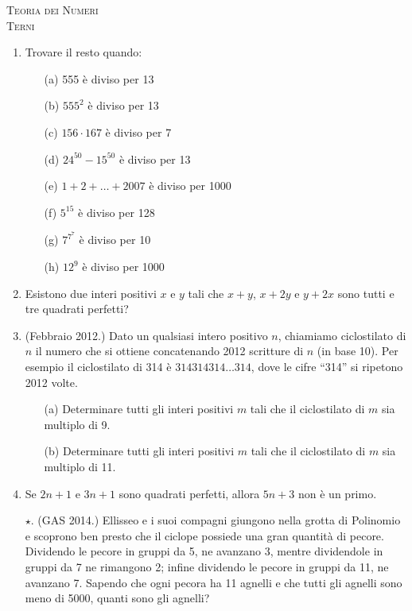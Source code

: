 \documentclass[a4paper]{article}
\theoremstyle{remark}
\theoremstyle{definition}
\begin{document}
\begin{center}
	\vspace*{0,5 cm}
	{\Huge \textsc{Teoria dei Numeri}} \\
	\vspace{0,5 cm}
	\textsc{Terni}
	\thispagestyle{empty}
	\vspace{0,7 cm}
\end{center}
\normalsize




\begin{enumerate}
	\item Trovare il resto quando:
	\begin{itemize}
		\item [(a)] 555 è diviso per 13
		\item [(b)] $ 555^2$ è diviso per 13
		\item [(c)] $ 156 \cdot 167 $ è diviso per 7
		\item [(d)] $ 24^{50} - 15^{50} $ è diviso per 13
		\item [(e)] $ 1 + 2 + \dots + 2007 $ è diviso per 1000
		\item [(f)] $ 5^{15} $ è diviso per 128
		\item [(g)]$  7^{7^7} $ è diviso per 10
		\item [(h)] $ 12^9 $ è diviso per 1000 \\
	\end{itemize}
	
	\item Esistono due interi positivi $ x $ e $ y $ tali che $ x+y $, $ x+2y $ e $ y+2x $ sono tutti e tre quadrati perfetti? \\
	
	\item (Febbraio 2012.) Dato un qualsiasi intero positivo $ n $, chiamiamo ciclostilato di $ n $ il numero che si ottiene concatenando 2012 scritture di $ n $ (in base 10). Per esempio il ciclostilato di 314 è $ 314314314\dots314 $, dove le cifre “314” si ripetono 2012 volte.
	\begin{itemize}
		\item [(a)] Determinare tutti gli interi positivi $ m $ tali che il ciclostilato di $ m $ sia multiplo di 9.
		\item [(b)] Determinare tutti gli interi positivi $ m $ tali che il ciclostilato di $ m $ sia multiplo di 11. \\
	\end{itemize}
	
	\item Se $ 2n + 1 $ e $ 3n + 1 $ sono quadrati perfetti, allora $ 5n + 3 $ non è un primo. \\
	
	\item[$ \star. $] (GAS 2014.) Ellisseo e i suoi compagni giungono nella grotta di Polinomio e scoprono ben presto che il ciclope possiede una
	gran quantità di pecore. Dividendo le pecore in gruppi da 5, ne avanzano 3, mentre dividendole in gruppi da 7 ne
	rimangono 2; infine dividendo le pecore in gruppi da 11, ne avanzano 7. Sapendo che ogni pecora ha 11 agnelli e che
	tutti gli agnelli sono meno di 5000, quanti sono gli agnelli?
	
\end{enumerate}
\end{document}
